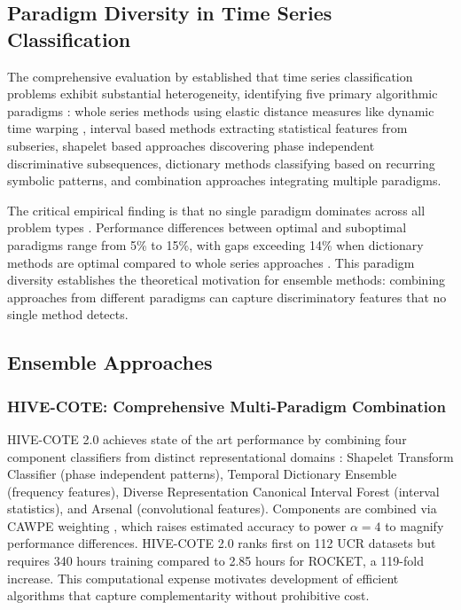 \documentclass[pdflatex,sn-basic]{sn-jnl}           %
\theoremstyle{thmstyleone}%
\theoremstyle{thmstyletwo}%
\theoremstyle{thmstylethree}%
\begin{document}
\subsection{Paradigm Diversity in Time Series Classification}

The comprehensive evaluation by \citet{tsc-bakeoff} established that time series classification problems exhibit substantial heterogeneity, identifying five primary algorithmic paradigms \citep[Section~2, pp.~610--611]{tsc-bakeoff}: whole series methods using elastic distance measures like dynamic time warping \citep[p.~611]{tsc-bakeoff}, interval based methods extracting statistical features from subseries, shapelet based approaches discovering phase independent discriminative subsequences, dictionary methods classifying based on recurring symbolic patterns, and combination approaches integrating multiple paradigms.

The critical empirical finding is that no single paradigm dominates across all problem types \citep[Table~11, p.~648]{tsc-bakeoff}. Performance differences between optimal and suboptimal paradigms range from 5\% to 15\%, with gaps exceeding 14\% when dictionary methods are optimal compared to whole series approaches \citep[Table~11, p.~648]{tsc-bakeoff}. This paradigm diversity establishes the theoretical motivation for ensemble methods: combining approaches from different paradigms can capture discriminatory features that no single method detects.

\subsection{Ensemble Approaches}

\subsubsection{HIVE-COTE: Comprehensive Multi-Paradigm Combination}

HIVE-COTE 2.0 achieves state of the art performance by combining four component classifiers from distinct representational domains \citep[p.~3]{hive-cote-2}: Shapelet Transform Classifier (phase independent patterns), Temporal Dictionary Ensemble (frequency features), Diverse Representation Canonical Interval Forest (interval statistics), and Arsenal (convolutional features). Components are combined via CAWPE weighting \citep{cawpe}, which raises estimated accuracy to power $\alpha=4$ to magnify performance differences. HIVE-COTE 2.0 ranks first on 112 UCR datasets but requires 340 hours training compared to 2.85 hours for ROCKET, a 119-fold increase. This computational expense motivates development of efficient algorithms that capture complementarity without prohibitive cost.
\end{document}
